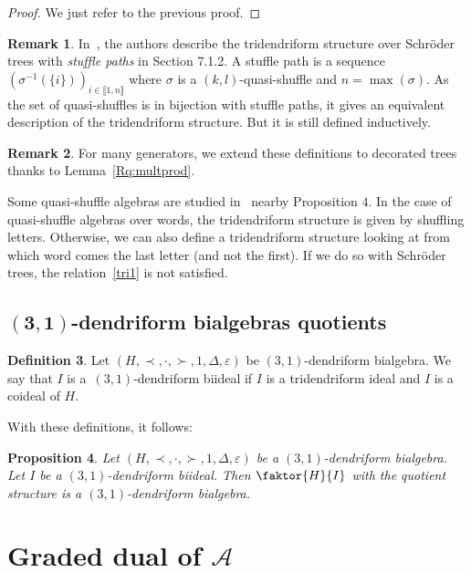 \documentclass[10pt,a4paper]{amsart}
\numberwithin{equation}{section}
\theoremstyle{definition}
\newtheorem{defi}{Definition}[section]
\newtheorem{Rq}[defi]{Remark}
\theoremstyle{plain}
\newtheorem{Prop}[defi]{Proposition}
\newcommand{\IEM}[2]{\llbracket #1,#2 \rrbracket}
\begin{document}
\begin{proof}
	We just refer to the previous proof.
\end{proof}

\begin{Rq}
	In~\cite{Tridend+co}, the authors describe the tridendriform structure over Schr\"oder trees with \emph{stuffle paths} in Section 7.1.2. A stuffle path is a sequence $\left(\sigma^{-1}(\{i\})\right)_{i\in \IEM{1}{n}}$ where $\sigma$ is a $(k,l)$-quasi-shuffle and $n=\max(\sigma).$ As the set of quasi-shuffles is in bijection with stuffle paths, it gives an equivalent description of the tridendriform structure. But it is still defined inductively.
\end{Rq}
\begin{Rq}
		For many generators, we extend these definitions to decorated trees thanks to Lemma~\ref{Rq:multprod}.
\end{Rq}
Some quasi-shuffle algebras are studied in~\cite{Quasi-shuffle} nearby Proposition $4$. In the case of quasi-shuffle algebras over words, the tridendriform structure is given by shuffling letters. Otherwise, we can also define a tridendriform structure looking at from which word comes the last letter (and not the first). If we do so with Schr\"oder trees, the relation~\eqref{tri1} is not satisfied.

\subsection[(3,1)-dendriform bialgebras quotients]{$\boldsymbol{(3,1)}$-dendriform bialgebras quotients}
\begin{defi}
	Let $(H,\prec,\cdot,\succ,1,\Delta,\varepsilon)$ be $(3,1)$-dendriform bialgebra. We say that $I$ is a~$(3,1)$-dendriform biideal if $I$ is a tridendriform ideal and $I$ is a coideal of $H$.
\end{defi}
With these definitions, it follows:
\begin{Prop}
	Let $(H,\prec,\cdot,\succ,1,\Delta,\varepsilon)$ be a $(3,1)$-dendriform bialgebra. Let $I$ be a $(3,1)$-dendriform biideal. Then $\faktor{H}{I}$ with the quotient structure is a $(3,1)$-dendriform bialgebra.
\end{Prop}



\section[Graded dual of A]{Graded dual of $\boldsymbol{\mathcal{A}}$} \label{sec4}
\end{document}

